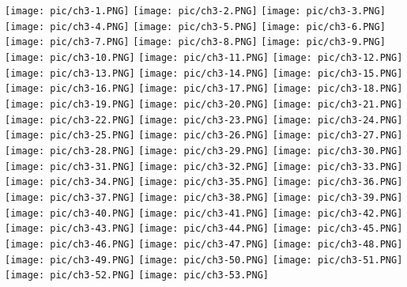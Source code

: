 \documentclass[UTF-8]{ctexart}
\begin{document}
\begin{center}
    \texttt{[image: pic/ch3-1.PNG]}
    \texttt{[image: pic/ch3-2.PNG]}
    \texttt{[image: pic/ch3-3.PNG]}
    \texttt{[image: pic/ch3-4.PNG]}
    \texttt{[image: pic/ch3-5.PNG]}
    \texttt{[image: pic/ch3-6.PNG]}
    \texttt{[image: pic/ch3-7.PNG]}
    \texttt{[image: pic/ch3-8.PNG]}
    \texttt{[image: pic/ch3-9.PNG]}
    \texttt{[image: pic/ch3-10.PNG]}
    \texttt{[image: pic/ch3-11.PNG]}
    \texttt{[image: pic/ch3-12.PNG]}
    \texttt{[image: pic/ch3-13.PNG]}
    \texttt{[image: pic/ch3-14.PNG]}
    \texttt{[image: pic/ch3-15.PNG]}
    \texttt{[image: pic/ch3-16.PNG]}
    \texttt{[image: pic/ch3-17.PNG]}
    \texttt{[image: pic/ch3-18.PNG]}
    \texttt{[image: pic/ch3-19.PNG]}
    \texttt{[image: pic/ch3-20.PNG]}
    \texttt{[image: pic/ch3-21.PNG]}
    \texttt{[image: pic/ch3-22.PNG]}
    \texttt{[image: pic/ch3-23.PNG]}
    \texttt{[image: pic/ch3-24.PNG]}
    \texttt{[image: pic/ch3-25.PNG]}
    \texttt{[image: pic/ch3-26.PNG]}
    \texttt{[image: pic/ch3-27.PNG]}
    \texttt{[image: pic/ch3-28.PNG]}
    \texttt{[image: pic/ch3-29.PNG]}
    \texttt{[image: pic/ch3-30.PNG]}
    \texttt{[image: pic/ch3-31.PNG]}
    \texttt{[image: pic/ch3-32.PNG]}
    \texttt{[image: pic/ch3-33.PNG]}
    \texttt{[image: pic/ch3-34.PNG]}
    \texttt{[image: pic/ch3-35.PNG]}
    \texttt{[image: pic/ch3-36.PNG]}
    \texttt{[image: pic/ch3-37.PNG]}
    \texttt{[image: pic/ch3-38.PNG]}
    \texttt{[image: pic/ch3-39.PNG]}
    \texttt{[image: pic/ch3-40.PNG]}
    \texttt{[image: pic/ch3-41.PNG]}
    \texttt{[image: pic/ch3-42.PNG]}
    \texttt{[image: pic/ch3-43.PNG]}
    \texttt{[image: pic/ch3-44.PNG]}
    \texttt{[image: pic/ch3-45.PNG]}
    \texttt{[image: pic/ch3-46.PNG]}
    \texttt{[image: pic/ch3-47.PNG]}
    \texttt{[image: pic/ch3-48.PNG]}
    \texttt{[image: pic/ch3-49.PNG]}
    \texttt{[image: pic/ch3-50.PNG]}
    \texttt{[image: pic/ch3-51.PNG]}
    \texttt{[image: pic/ch3-52.PNG]}
    \texttt{[image: pic/ch3-53.PNG]}

\end{center}
\end{document}
